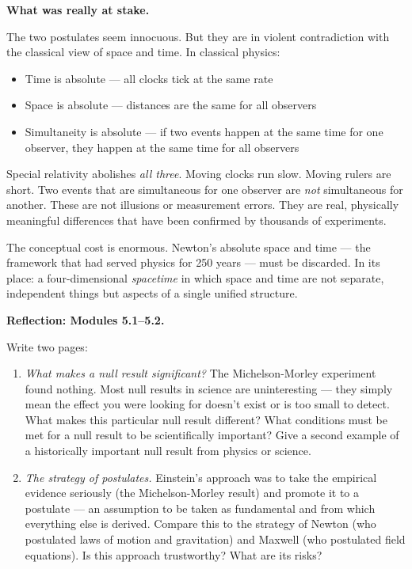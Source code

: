 \documentclass[12pt, a4paper, twoside]{book}
\begin{document}
\begin{crisisbox}
\textbf{What was really at stake.}

The two postulates seem innocuous. But they are in violent contradiction with the classical view of space and time. In classical physics:
\begin{itemize}[leftmargin=1.5em,itemsep=2pt]
  \item Time is absolute --- all clocks tick at the same rate
  \item Space is absolute --- distances are the same for all observers
  \item Simultaneity is absolute --- if two events happen at the same time for one observer, they happen at the same time for all observers
\end{itemize}

Special relativity abolishes \textit{all three}. Moving clocks run slow. Moving rulers are short. Two events that are simultaneous for one observer are \textit{not} simultaneous for another. These are not illusions or measurement errors. They are real, physically meaningful differences that have been confirmed by thousands of experiments.

The conceptual cost is enormous. Newton's absolute space and time --- the framework that had served physics for 250 years --- must be discarded. In its place: a four-dimensional \textit{spacetime} in which space and time are not separate, independent things but aspects of a single unified structure.
\end{crisisbox}

\begin{reflectionbox}
\textbf{Reflection: Modules 5.1--5.2.}

Write two pages:

\begin{enumerate}[leftmargin=2em,itemsep=6pt]
  \item \textit{What makes a null result significant?} The Michelson-Morley experiment found nothing. Most null results in science are uninteresting --- they simply mean the effect you were looking for doesn't exist or is too small to detect. What makes this particular null result different? What conditions must be met for a null result to be scientifically important? Give a second example of a historically important null result from physics or science.

  \item \textit{The strategy of postulates.} Einstein's approach was to take the empirical evidence seriously (the Michelson-Morley result) and promote it to a postulate --- an assumption to be taken as fundamental and from which everything else is derived. Compare this to the strategy of Newton (who postulated laws of motion and gravitation) and Maxwell (who postulated field equations). Is this approach trustworthy? What are its risks?
\end{enumerate}
\end{reflectionbox}
\end{document}
